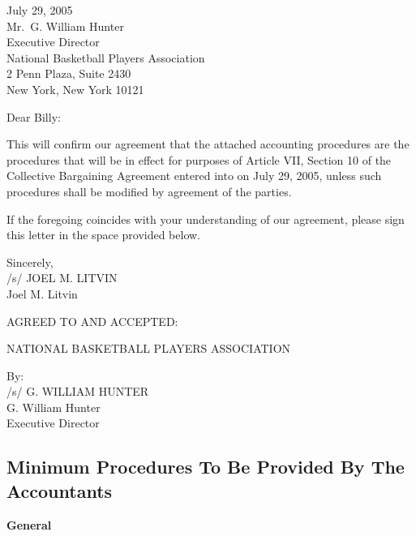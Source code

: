 \documentclass[
]{book}
\begin{document}
July 29, 2005\\
Mr.~G. William Hunter\\
Executive Director\\
National Basketball Players Association\\
2 Penn Plaza, Suite 2430\\
New York, New York 10121

Dear Billy:

This will confirm our agreement that the attached accounting procedures are the procedures that will be in effect for purposes of Article VII, Section 10 of the Collective Bargaining Agreement entered into on July 29, 2005, unless such procedures shall be modified by agreement of the parties.

If the foregoing coincides with your understanding of our agreement, please sign this letter in the space provided below.

Sincerely,\\
/s/ JOEL M. LITVIN\\
Joel M. Litvin

AGREED TO AND ACCEPTED:

NATIONAL BASKETBALL PLAYERS ASSOCIATION

By:\\
/s/ G. WILLIAM HUNTER\\
G. William Hunter\\
Executive Director

\newpage

\hypertarget{minimum-procedures-to-be-provided-by-the-accountants}{%
\subsection{Minimum Procedures To Be Provided By The Accountants}\label{minimum-procedures-to-be-provided-by-the-accountants}}

\textbf{General}
\end{document}
